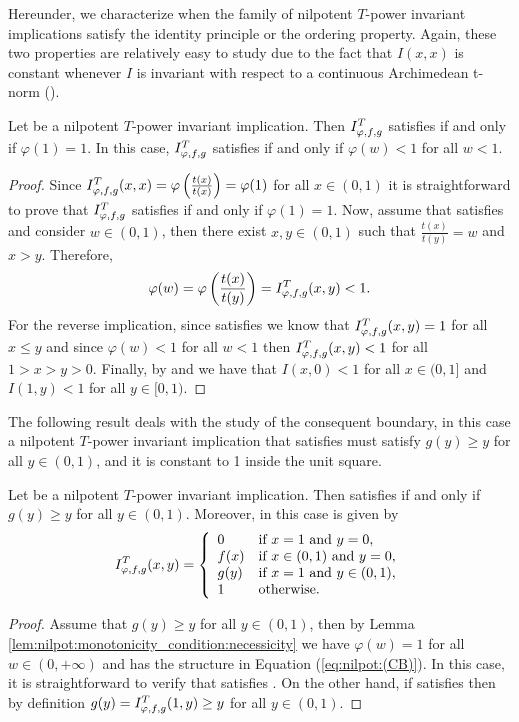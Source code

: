 
Hereunder, we characterize when the family of nilpotent $T$-power invariant implications satisfy the identity principle or the ordering property. Again, these two properties are relatively easy to study due to the fact that $I(x,x)$ is constant whenever $I$ is invariant with respect to a continuous Archimedean t-norm (\cite[Lemma 6]{Massanet2019B}).


\begin{proposition}\label{prop:nilpotent:(OP)n(IP)}
	Let \IT be a nilpotent $T$-power invariant implication. Then $I^T_{\varphi,f,g}$ satisfies \IP if and only if $\varphi(1)=1$. In this case, $I^T_{\varphi,f,g}$ satisfies \OP if and only if $\varphi(w)<1$ for all $w<1$.
\end{proposition}
\begin{proof}
	Since $I^T_{\varphi,f,g}(x,x)=\varphi \left(\frac{t(x)}{t(x)}\right) =\varphi(1)$ for all $x \in (0,1)$ it is straightforward to prove that $I^T_{\varphi,f,g}$ satisfies \IP if and only if $\varphi(1)=1$. Now, assume that \IT satisfies \OP and consider $w \in (0,1)$, then there exist $x,y \in (0,1)$ such that $\frac{t(x)}{t(y)}=w$ and $x > y$. Therefore,
	$$\varphi(w)=\varphi \left(\frac{t(x)}{t(y)}\right) = I^T_{\varphi,f,g}(x,y) <1.$$
	For the reverse implication, since \IT satisfies \IP we know that $I^T_{\varphi,f,g}(x,y)=1$ for all $x \leq y$ and since $\varphi(w)<1$ for all $w<1$ then $I^T_{\varphi,f,g}(x,y)<1$ for all $1>x>y>0$. Finally, by \Ione and \Itwo we have that $I(x,0)<1$ for all $x \in (0,1]$ and $I(1,y)<1$ for all $y \in [0,1)$.
\end{proof}


The following result deals with the study of the consequent boundary, in this case a nilpotent $T$-power invariant implication that satisfies \CB must satisfy $g(y) \geq y$ for all $y \in (0,1)$, and it is constant to 1 inside the unit square.

\begin{proposition}\label{prop:nilpot:(CB)}
	Let \IT be a nilpotent $T$-power invariant implication. Then \IT satisfies \CB if and only if $g(y) \geq y$ for all $y \in (0,1)$. Moreover, in this case \IT is given by
	\begin{equation}\label{eq:nilpot:(CB)}
		I^T_{\varphi,f,g}(x,y) =\left\{ \begin{array}{ll}
			0 &   \text{if }   x=1 \text{ and } y=0, \\
			f(x) &  \text{if }  x \in (0,1) \text{ and } y=0, \\
			g(y) &  \text{if } x=1 \text{ and } y \in (0,1), \\
			1 & \text{otherwise.}
		\end{array}
		\right.
	\end{equation}
\end{proposition}
\begin{proof}
	Assume that $g(y) \geq y$ for all $y \in (0,1)$, then by Lemma \ref{lem:nilpot:monotonicity_condition:necessicity} we have $\varphi(w)=1$ for all $w \in(0,+\infty)$ and \IT has the structure in Equation (\ref{eq:nilpot:(CB)}). In this case, it is straightforward to verify that \IT satisfies \CB. On the other hand, if \IT satisfies \CB then by definition $g(y)=I^T_{\varphi,f,g}(1,y)\geq y$ for all $y \in (0,1)$.
\end{proof}

